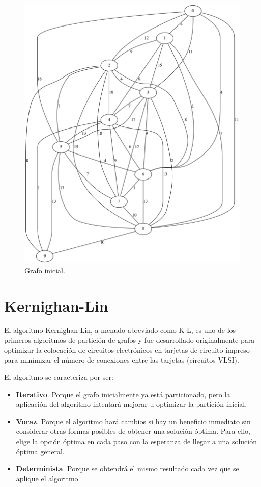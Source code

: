 \renewcommand{\figurename}{Figura}
\begin{figure}[h]
	\centering
	\includegraphics[scale=0.3]{Figures/10_dataset}
	\vspace{1mm}
	\caption{Grafo inicial.}
	\label{grafo}
\end{figure}

\newpage
\section{Kernighan-Lin}\label{Kernighan-Lin}

El algoritmo Kernighan-Lin\cite{KernighanLin}, a menudo abreviado como K-L, es uno de los primeros algoritmos de partición de grafos y fue desarrollado originalmente para optimizar la colocación de circuitos electrónicos en tarjetas de circuito impreso para minimizar el número de conexiones entre las tarjetas (circuitos VLSI\cite{KernighanLin}\cite{Ravikumar}).

El algoritmo se caracteriza por ser:

\begin{itemize}
	\item \textbf{Iterativo}. Porque el grafo inicialmente ya está particionado, pero la aplicación del algoritmo intentará mejorar u optimizar la partición inicial. 
	\item \textbf{Voraz}. Porque el algoritmo hará cambios si hay un beneficio inmediato sin considerar otras formas posibles de obtener una solución óptima. Para ello, elige la opción óptima en cada paso con la esperanza de llegar a una solución óptima general.
	\item \textbf{Determinista}. Porque se obtendrá el mismo resultado cada vez que se aplique el algoritmo. 
\end{itemize}


